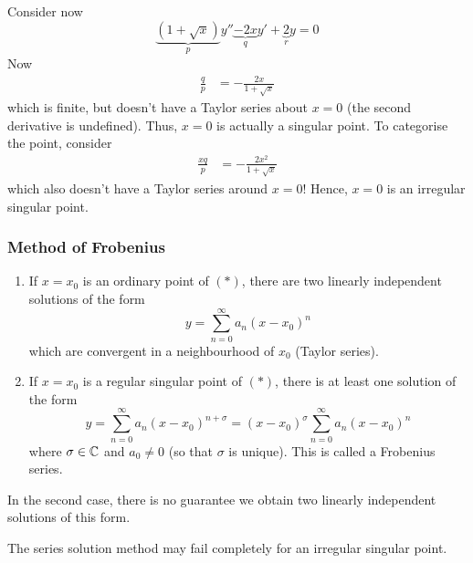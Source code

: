 \documentclass{../../template/note}
\begin{document}
    \begin{example}
        Consider now
        \[
            \underbrace{(1+\sqrt x)}_{p}y'' \underbrace{- 2x}_{q}y' + \underbrace{2}_{r}y = 0
        \]
        Now
        \begin{align*}
            \frac{q}{p} &= -\frac{2x}{1+\sqrt x}
        \end{align*}
        which is finite, but doesn't have a Taylor series about \(x=0\) (the second derivative is undefined). Thus, \(x=0\) is actually a singular point. To categorise the point, consider
        \begin{align*}
            \frac{xq}{p} &= -\frac{2x^2}{1 +\sqrt x}
        \end{align*}
        which also doesn't have a Taylor series around \(x=0\)! Hence, \(x=0\) is an irregular singular point.        
    \end{example}
    
    \subsubsection{Method of Frobenius}

    \begin{theorem}[Fuch]
        \begin{enumerate}[label=\protect\circled{\arabic*}]
            \item If \(x=x_0\) is an ordinary point of \((*)\), there are two linearly independent solutions of the form
            \[
                y = \sum_{n=0}^\infty a_n (x-x_0)^n
            \]
            which are convergent in a neighbourhood of \(x_0\) (Taylor series).
            \item If \(x=x_0\) is a regular singular point of \((*)\), there is at least one solution of the form
            \[
                y = \sum_{n=0}^\infty a_n (x-x_0)^{n+\sigma} = (x-x_0)^\sigma \sum_{n=0}^\infty a_n (x-x_0)^n
            \]
            where \(\sigma \in \mathbb C\) and \(a_0 \neq 0\) (so that \(\sigma\) is unique). This is called a Frobenius series.
        \end{enumerate}
    \end{theorem}
    
    \begin{remark*}
        In the second case, there is no guarantee we obtain two linearly independent solutions of this form.
    \end{remark*}
    
    \begin{remark*}
        The series solution method may fail completely for an irregular singular point.
    \end{remark*}
    
\end{document}
